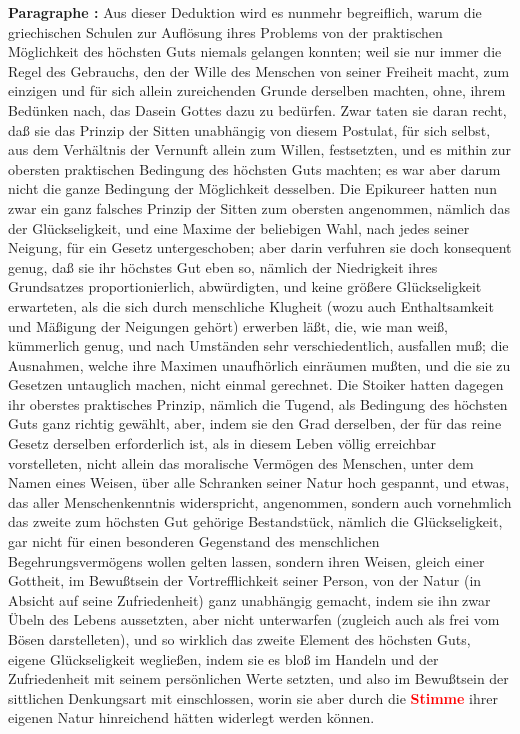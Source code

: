 \documentclass[a4paper,12pt,twoside]{book}
\newcommand{\match}[1]{\textcolor{red}{\textbf{#1}}}
\begin{document}
	\noindent\textbf{Paragraphe : }Aus dieser Deduktion wird es nunmehr begreiflich, warum die griechischen Schulen zur Auflösung ihres Problems von der praktischen Möglichkeit des höchsten Guts niemals gelangen konnten; weil sie nur immer die Regel des Gebrauchs, den der Wille des Menschen von seiner Freiheit macht, zum einzigen und für sich allein zureichenden Grunde derselben machten, ohne, ihrem Bedünken nach, das Dasein Gottes dazu zu bedürfen. Zwar taten sie daran recht, daß sie das Prinzip der Sitten unabhängig von diesem Postulat, für sich selbst, aus dem Verhältnis der Vernunft allein zum Willen, festsetzten, und es mithin zur obersten praktischen Bedingung des höchsten Guts machten; es war aber darum nicht die ganze Bedingung der Möglichkeit desselben. Die Epikureer hatten nun zwar ein ganz falsches Prinzip der Sitten zum obersten angenommen, nämlich das der Glückseligkeit, und eine Maxime der beliebigen Wahl, nach jedes seiner Neigung, für ein Gesetz untergeschoben; aber darin verfuhren sie doch konsequent genug, daß sie ihr höchstes Gut eben so, nämlich der Niedrigkeit ihres Grundsatzes proportionierlich, abwürdigten, und keine größere Glückseligkeit erwarteten, als die sich durch menschliche Klugheit (wozu auch Enthaltsamkeit und Mäßigung der Neigungen gehört) erwerben läßt, die, wie man weiß, kümmerlich genug, und nach Umständen sehr verschiedentlich, ausfallen muß; die Ausnahmen, welche ihre  Maximen unaufhörlich einräumen mußten, und die sie zu Gesetzen untauglich machen, nicht einmal gerechnet. Die Stoiker hatten dagegen ihr oberstes praktisches Prinzip, nämlich die Tugend, als Bedingung des höchsten Guts ganz richtig gewählt, aber, indem sie den Grad derselben, der für das reine Gesetz derselben erforderlich ist, als in diesem Leben völlig erreichbar vorstelleten, nicht allein das moralische Vermögen des Menschen, unter dem Namen eines Weisen, über alle Schranken seiner Natur hoch gespannt, und etwas, das aller Menschenkenntnis widerspricht, angenommen, sondern auch vornehmlich das zweite zum höchsten Gut gehörige Bestandstück, nämlich die Glückseligkeit, gar nicht für einen besonderen Gegenstand des menschlichen Begehrungsvermögens wollen gelten lassen, sondern ihren Weisen, gleich einer Gottheit, im Bewußtsein der Vortrefflichkeit seiner Person, von der Natur (in Absicht auf seine Zufriedenheit) ganz unabhängig gemacht, indem sie ihn zwar Übeln des Lebens aussetzten, aber nicht unterwarfen (zugleich auch als frei vom Bösen darstelleten), und so wirklich das zweite Element des höchsten Guts, eigene Glückseligkeit wegließen, indem sie es bloß im Handeln und der Zufriedenheit mit seinem persönlichen Werte setzten, und also im Bewußtsein der sittlichen Denkungsart mit einschlossen, worin sie aber durch die \match{Stimme} ihrer eigenen Natur hinreichend hätten widerlegt werden können. 
	
	
	
\end{document}
